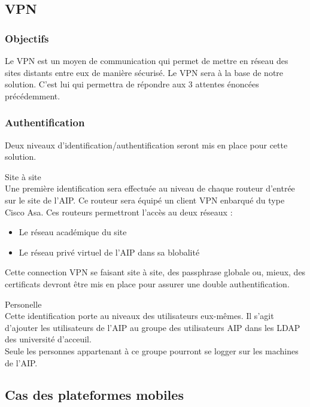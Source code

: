 \documentclass[a4paper]{article}
\begin{document}
\subsection{VPN}
\subsubsection{Objectifs}
Le VPN est un moyen de communication qui permet de mettre en réseau des sites distants entre eux de manière sécurisé.
Le VPN sera à la base de notre solution. C'est lui qui permettra de répondre aux 3 attentes énoncées précédemment.


\subsubsection{Authentification}
Deux niveaux d'identification/authentification seront mis en place pour cette solution.
\begin{description}
\item{Site à site} \\
Une première identification sera effectuée au niveau de chaque routeur d'entrée sur le site de l'AIP. Ce routeur sera équipé un client VPN enbarqué du type Cisco Asa. Ces routeurs permettront l'accès au deux réseaux : 
\begin{itemize}
\item Le réseau académique du site
\item Le réseau privé virtuel de l'AIP dans sa blobalité
\end{itemize}
Cette connection VPN se faisant site à site, des passphrase globale ou, mieux, des certificats devront être mis en place pour assurer une double authentification.

\item{Personelle} \\
Cette identification porte au niveaux des utilisateurs eux-mêmes. Il s'agit d'ajouter les utilisateurs de l'AIP au groupe des utilisateurs AIP dans les LDAP des université d'acceuil.\\
Seule les personnes appartenant à ce groupe pourront se logger sur les machines de l'AIP.

\end{description}

\subsection{Cas des plateformes mobiles}
\end{document}
